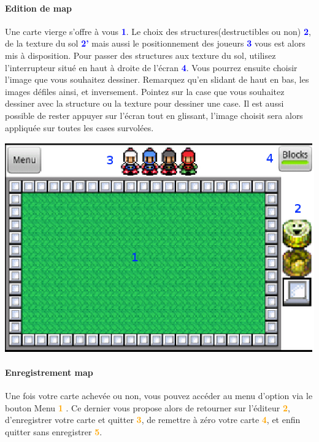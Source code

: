 	
	\paragraph{Edition de map\\}
	Une carte vierge s'offre à vous \textcolor{blue}{\textbf{1}}. Le choix des
	structures(destructibles ou non) \textcolor{blue}{\textbf{2}}, de la texture du
	sol \textcolor{blue}{\textbf{2'}} mais aussi le positionnement des joueurs
	\textcolor{blue}{\textbf{3}} vous est alors mis à disposition. Pour passer des
	structures aux texture du sol, utilisez l'interrupteur situé en haut à droite
	de l'écran \textcolor{blue}{\textbf{4}}. Vous pourrez ensuite choisir l'image
	que vous souhaitez dessiner. Remarquez qu'en slidant de haut en bas, les images défiles ainsi, et inversement. Pointez
	sur la case que vous souhaitez dessiner avec la structure ou la texture pour
	dessiner une case. Il est aussi possible de rester appuyer sur l'écran tout en
	glissant, l'image choisit sera alors appliquée sur toutes les cases survolées.
	
	
	\begin{center}
		\includegraphics[scale=0.7]{Manuel/Img/11.eps}
	\end{center}
	
	\paragraph{Enregistrement map\\}
	Une fois votre carte achevée ou non, vous pouvez accéder au menu d'option
	via le bouton Menu \textcolor{orange}{\textbf{1}} . Ce dernier vous propose
	alors de retourner sur l'éditeur \textcolor{orange}{\textbf{2}}, d'enregistrer votre
	carte et quitter \textcolor{orange}{\textbf{3}}, de remettre à zéro votre carte
	\textcolor{orange}{\textbf{4}}, et enfin quitter sans enregistrer
	\textcolor{orange}{\textbf{5}}. 
	
